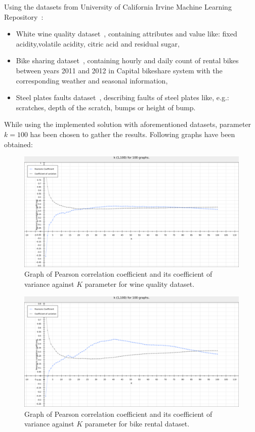 Using the datasets from University of California Irvine Machine Learning Repository~\cite{uci_datasets}:

\begin{itemize}
\item White wine quality dataset~\cite{dataset_wine}, containing attributes and value like: fixed acidity,volatile acidity, citric acid and residual sugar,
\item Bike sharing dataset~\cite{dataset_bike_rental}, containing hourly and daily count of rental bikes between years 2011 and 2012 in Capital bikeshare system with the corresponding weather and seasonal information,
\item Steel plates faults dataset~\cite{dataset_steel_plates_faults}, describing faults of steel plates like, e.g.: scratches, depth of the scratch, bumps or height of bump.
\end{itemize}

While using the implemented solution with aforementioned datasets, parameter $k = 100$ has been chosen to gather the results.
Following graphs have been obtained:

\begin{figure}[h!]
  \centering
  \captionsetup{justification=centering}
    \includegraphics[width=1.05\textwidth]{images/k100_wine1000.png}
  \caption{Graph of Pearson correlation coefficient and its coefficient of variance against $K$ parameter for wine quality dataset.}
  \label{fig:graph_wine}
\end{figure}


\begin{figure}[h!]
  \centering
  \captionsetup{justification=centering}
    \includegraphics[width=1.05\textwidth]{images/k100_hour1000.png}
  \caption{Graph of Pearson correlation coefficient and its coefficient of variance against $K$ parameter for bike rental dataset.}
  \label{fig:graph_bike_rental}
\end{figure}


